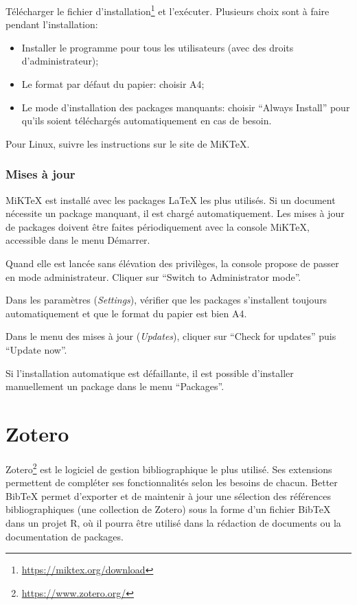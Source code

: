 \documentclass[
  12pt,
  french,
  a4paper,
  extrafontsizes,onecolumn,openright
  ]{memoir}
\providecommand{\tightlist}{%
  \setlength{\itemsep}{0pt}\setlength{\parskip}{0pt}}
\begin{document}
Télécharger le fichier d'installation\footnote{\url{https://miktex.org/download}} et l'exécuter.
Plusieurs choix sont à faire pendant l'installation:

\begin{itemize}
\tightlist
\item
  Installer le programme pour tous les utilisateurs (avec des droits d'administrateur);
\item
  Le format par défaut du papier: choisir A4;
\item
  Le mode d'installation des packages manquants: choisir \enquote{Always Install} pour qu'ils soient téléchargés automatiquement en cas de besoin.
\end{itemize}

Pour Linux, suivre les instructions sur le site de MiKTeX.

\subsubsection{Mises à jour}\label{mises-uxe0-jour}

MiKTeX est installé avec les packages LaTeX les plus utilisés.
Si un document nécessite un package manquant, il est chargé automatiquement.
Les mises à jour de packages doivent être faites périodiquement avec la console MiKTeX, accessible dans le menu Démarrer.

Quand elle est lancée sans élévation des privilèges, la console propose de passer en mode administrateur.
Cliquer sur \enquote{Switch to Administrator mode}.

Dans les paramètres (\emph{Settings}), vérifier que les packages s'installent toujours automatiquement et que le format du papier est bien A4.

Dans le menu des mises à jour (\emph{Updates}), cliquer sur \enquote{Check for updates} puis \enquote{Update now}.

Si l'installation automatique est défaillante, il est possible d'installer manuellement un package dans le menu \enquote{Packages}.

\section{Zotero}\label{sec:Zotero}

Zotero\footnote{\url{https://www.zotero.org/}} est le logiciel de gestion bibliographique le plus utilisé.
Ses extensions permettent de compléter ses fonctionnalités selon les besoins de chacun.
Better BibTeX permet d'exporter et de maintenir à jour une sélection des références bibliographiques (une collection de Zotero) sous la forme d'un fichier BibTeX dans un projet R, où il pourra être utilisé dans la rédaction de documents ou la documentation de packages.
\end{document}
